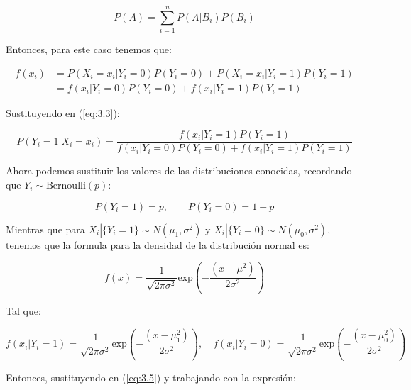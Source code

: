 \begin{equation}
    P(A)=\sum_{i=1}^{n}P(A|B_i)P(B_i)
    \label{eq:3.4}
\end{equation}

Entonces, para este caso tenemos que:

\begin{align*}
    f(x_i)&=P(X_i=x_i|Y_i=0)P(Y_i=0)+P(X_i=x_i|Y_i=1)P(Y_i=1)\\[0.1cm]
          &=f(x_i|Y_i=0)P(Y_i=0)+f(x_i|Y_i=1)P(Y_i=1)
\end{align*}

\newpage
Sustituyendo en (\ref{eq:3.3}):

\begin{equation}
    P(Y_i=1|X_i=x_i)=\frac{f(x_i|Y_i=1)P(Y_i=1)}{f(x_i|Y_i=0)P(Y_i=0)+f(x_i|Y_i=1)P(Y_i=1)}
    \label{eq:3.5}
\end{equation}

Ahora podemos sustituir los valores de las distribuciones conocidas, recordando que $Y_i\sim \text{Bernoulli}(p)$:

\begin{equation*}
    P(Y_i=1)=p,\qquad P(Y_i=0)=1-p
\end{equation*}

Mientras que para $X_i | \{Y_i = 1\} \sim N(\mu_1, \sigma^2)\text{ y }X_i | \{Y_i = 0\} \sim N(\mu_0, \sigma^2),$ tenemos que la formula para la densidad de la distribución normal es:

\begin{equation}
    f(x)=\frac{1}{\sqrt{2\pi\sigma^2}}\text{exp}\left(-\frac{(x-\mu^2)}{2\sigma^2}\right)
    \label{eq:3.6}
\end{equation}

Tal que:

\begin{equation*}
    f(x_i|Y_i=1)=\frac{1}{\sqrt{2\pi\sigma^2}}\text{exp}\left(-\frac{(x-\mu_1^2)}{2\sigma^2}\right), \quad f(x_i|Y_i=0)=\frac{1}{\sqrt{2\pi\sigma^2}}\text{exp}\left(-\frac{(x-\mu_0^2)}{2\sigma^2}\right)
\end{equation*}

Entonces, sustituyendo en (\ref{eq:3.5}) y trabajando con la expresión:


